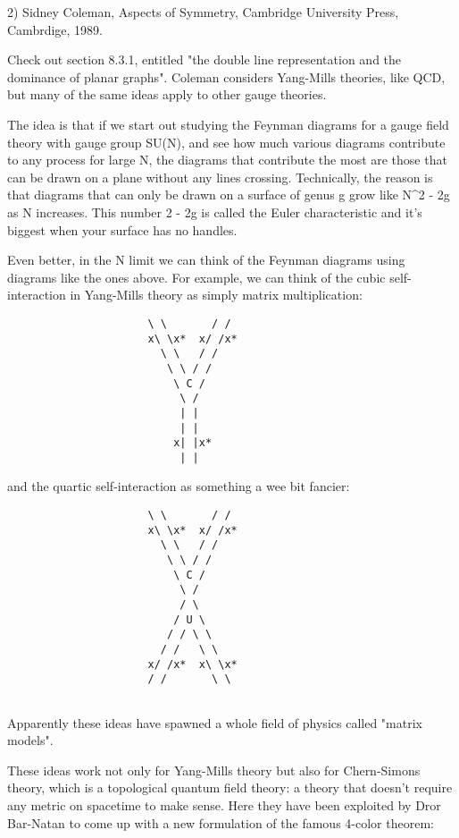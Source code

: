 2) Sidney Coleman, Aspects of Symmetry, Cambridge University Press,
Cambrdige, 1989.  

Check out section 8.3.1, entitled "the double line representation
and the dominance of planar graphs".  Coleman considers Yang-Mills
theories, like QCD, but many of the same ideas apply to other gauge
theories.   

The idea is that if we start out studying the Feynman diagrams for a gauge 
field theory with gauge group SU(N), and see how much various diagrams
contribute to any process for large N, the diagrams that contribute the
most are those that can be drawn on a plane without any lines crossing.
Technically, the reason is that diagrams that can only be drawn on a 
surface of genus g grow like N^{2 - 2g} as N increases.  This number
2 - 2g is called the Euler characteristic and it's biggest when
your surface has no handles.  

Even better, in the N \to  \infty  limit we can think of the Feynman
diagrams using diagrams like the ones above.  For example, we can 
think of the cubic self-interaction in Yang-Mills theory as simply
matrix multiplication:

\begin{verbatim}
                      \ \       / /
                      x\ \x*  x/ /x*
                        \ \   / /
                         \ \ / /
                          \ C /
                           \ /
                           | |
                           | |
                          x| |x*
                           | |

\end{verbatim}
    
and the quartic self-interaction as something a wee bit fancier:

\begin{verbatim}
                      \ \       / /
                      x\ \x*  x/ /x*
                        \ \   / /
                         \ \ / /
                          \ C /
                           \ /
                           / \
                          / U \
                         / / \ \
                        / /   \ \
                      x/ /x*  x\ \x*
                      / /       \ \ 


\end{verbatim}
    
Apparently these ideas have spawned a whole field of physics called
"matrix models".

These ideas work not only for Yang-Mills theory but also for Chern-Simons 
theory, which is a topological quantum field theory: a theory that doesn't 
require any metric on spacetime to make sense.  Here they have been exploited
by Dror Bar-Natan to come up with a new formulation of the famous 4-color 
theorem:

